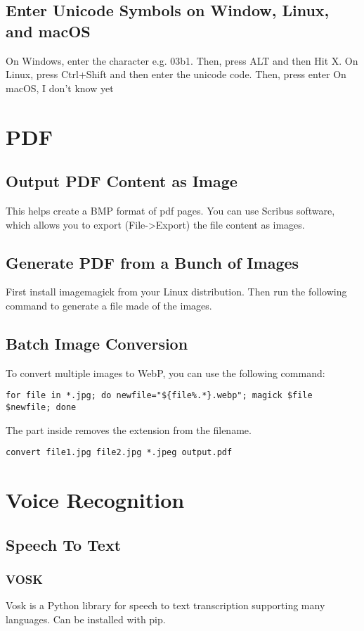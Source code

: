 \documentclass{article}
\begin{document}
\subsection{Enter Unicode Symbols on Window, Linux, and macOS}
On Windows, enter the character e.g. 03b1. Then, press ALT and then Hit X. 
On Linux, press Ctrl+Shift and then enter the unicode code. Then, press enter
On macOS, I don't know yet

\section{PDF}

\subsection{Output PDF Content as Image}
This helps create a BMP format of pdf pages. You can use Scribus software, which allows you to export (File->Export) the file content as images.

\subsection{Generate PDF from a Bunch of Images}
First install imagemagick from your Linux distribution. Then run the following command to generate a file made of the images.

\subsection{Batch Image Conversion}
To convert multiple images to WebP, you can use the following command:
\begin{verbatim}
for file in *.jpg; do newfile="${file%.*}.webp"; magick $file $newfile; done
\end{verbatim}
The part inside \lstlstine{${}} removes the extension from the filename.


\begin{lstlisting}
convert file1.jpg file2.jpg *.jpeg output.pdf
\end{lstlisting}

\section{Voice Recognition}
\subsection{Speech To Text}
\subsubsection{VOSK}
Vosk is a Python library for speech to text transcription supporting many languages. 
Can be installed with pip.
\end{document}
